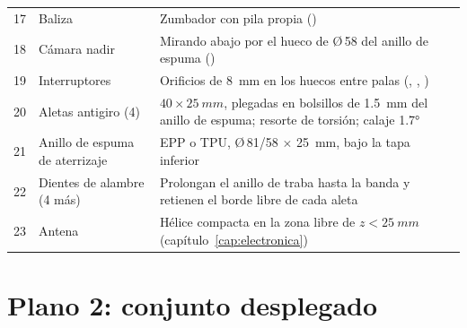 \begin{table}[H]
\begin{tabularx}{\textwidth}{@{}clY@{}}
17 & Baliza & Zumbador con pila propia ()\\
18 & Cámara nadir & Mirando abajo por el hueco de Ø\,58 del anillo de espuma ()\\
19 & Interruptores & Orificios de \SI{8}{mm} en los huecos entre palas (, , )\\
20 & Aletas antigiro (4) & $40\times\SI{25}{mm}$, plegadas en bolsillos de \SI{1.5}{mm} del anillo de espuma; resorte de torsión; calaje \ang{1.7}\\
21 & Anillo de espuma de aterrizaje & EPP o TPU, Ø\,81/58 $\times$ \SI{25}{mm}, bajo la tapa inferior\\
22 & Dientes de alambre (4 más) & Prolongan el anillo de traba hasta la banda y retienen el borde libre de cada aleta\\
23 & Antena & Hélice compacta en la zona libre de $z<\SI{25}{mm}$ (capítulo~\ref{cap:electronica})\\
\bottomrule
\end{tabularx}
\end{table}

\section{Plano 2: conjunto desplegado}

